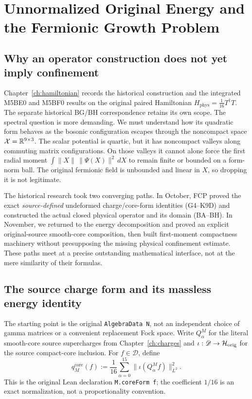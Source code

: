 \chapter[Original Energy and Fermionic Growth]{Unnormalized Original Energy and the Fermionic Growth Problem}
\label{ch:energy}

\section{Why an operator construction does not yet imply confinement}
Chapter~\ref{ch:hamiltonian} records the historical construction and
the integrated M5BE0 and M5BF0 results on the original paired
Hamiltonian \(H_{\mathrm{phys}}=\frac1{16}T^\dagger T\).
The separate historical BG/BH correspondence retains its own scope. The spectral question is more
demanding. We must understand how its quadratic form behaves as the bosonic
configuration escapes through the noncompact space
\(\mathcal X=\mathbb R^{9\times3}\). The scalar potential is quartic,
but it has noncompact valleys along commuting matrix configurations. On those
valleys it cannot alone force the first radial moment
\(\int\|X\|\,\|\Psi(X)\|^2\,dX\) to remain finite or bounded on a
form-norm ball. The original fermionic field is unbounded and linear in \(X\),
so dropping it is not legitimate.

The historical research took two converging paths. In October, FCP proved the
exact \emph{source-defined} undeformed charge/core-form identities (G4--K9D)
and constructed the actual closed physical operator and its domain (BA--BH).
In November, we returned to the energy decomposition and proved an explicit
original-source smooth-core composition, then built first-moment compactness
machinery without presupposing the missing physical confinement estimate.
These paths meet at a precise outstanding mathematical interface, not at the
mere similarity of their formulas.

\section{The source charge form and its massless energy identity}
The starting point is the original \texttt{AlgebraData N}, not an independent
choice of gamma matrices or a convenient replacement Fock space. Write
\(Q_\alpha^M\) for the literal smooth-core source supercharges from
Chapter~\ref{ch:charges} and
\(\iota:\mathscr D\to\mathcal H_{\mathrm{orig}}\) for the source compact-core inclusion.
For \(f\in\mathscr D\), define
\begin{equation}\label{eq:energy-coreForm}
 q_M^{\mathrm{core}}(f):=\frac1{16}\sum_{\alpha=0}^{15}
   \|\iota(Q_\alpha^M f)\|_{L^2}^2.
\end{equation}
This is the original Lean declaration \texttt{M.coreForm f}; the coefficient
\(1/16\) is an exact normalization, not a proportionality convention.

